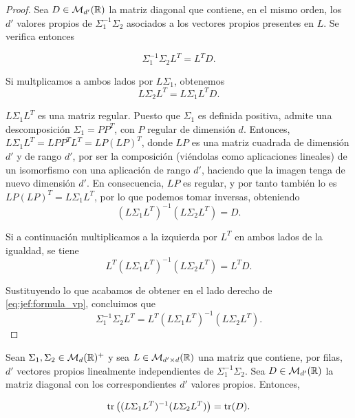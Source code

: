 \begin{proof} \label{thm:dmlmj1}
    Sea $D \in \mathcal{M}_{d'}(\mathbb{R})$ la matriz diagonal que contiene, en el mismo orden, los $d'$ valores propios de $\Sigma_1^{-1}\Sigma_2$ asociados a los vectores propios presentes en $L$. Se verifica entonces
    
    \begin{equation}\label{eq:jef:formula_vp}
        \Sigma_1^{-1}\Sigma_2L^T = L^TD.
    \end{equation} 

    Si multplicamos a ambos lados por $L\Sigma_1$, obtenemos
    \[ L\Sigma_2L^T = L\Sigma_1L^TD. \]

    $L\Sigma_1L^T$ es una matriz regular. Puesto que $\Sigma_1$ es definida positiva, admite una descomposición $\Sigma_1 = PP^T$, con $P$ regular de dimensión $d$. Entonces, $L\Sigma_1L^T = LPP^TL^T = LP(LP)^T$, donde $LP$ es una matriz cuadrada de dimensión $d'$ y de rango $d'$, por ser la composición (viéndolas como aplicaciones lineales) de un isomorfismo con una aplicación de rango $d'$, haciendo que la imagen tenga de nuevo dimensión $d'$. En consecuencia, $LP$ es regular, y por tanto también lo es $LP(LP)^T = L\Sigma_1L^T$, por lo que podemos tomar inversas, obteniendo
    \begin{equation} \label{eq:jef:coro1_pre}
        (L\Sigma_1L^T)^{-1}(L\Sigma_2L^T) = D.
    \end{equation}

    Si a continuación multiplicamos a la izquierda por $L^T$ en ambos lados de la igualdad, se tiene
    \[ L^T(L\Sigma_1L^T)^{-1}(L\Sigma_2L^T) = L^TD. \]

    Sustituyendo lo que acabamos de obtener en el lado derecho de \ref{eq:jef:formula_vp}, concluimos que
    \[\Sigma_1^{-1}\Sigma_2L^T = L^T(L\Sigma_1L^T)^{-1}(L\Sigma_2L^T).\]

\end{proof}

\begin{cor} \label{cor:dmlmj1}
    Sean $\Sigma_1, \Sigma_2 \in \mathcal{M}_d(\mathbb{R})^+$ y sea $L \in \mathcal{M}_{d'\times d}(\mathbb{R})$ una matriz que contiene, por filas, $d'$ vectores propios linealmente independientes de $\Sigma_1^{-1}\Sigma_2$. Sea $D \in \mathcal{M}_{d'}(\mathbb{R})$ la matriz diagonal con los correspondientes $d'$ valores propios. Entonces,

    \[ \operatorname{tr}\left( (L\Sigma_1L^T)^{-1}(L\Sigma_2L^T) \right) = \operatorname{tr}(D). \]
\end{cor}

